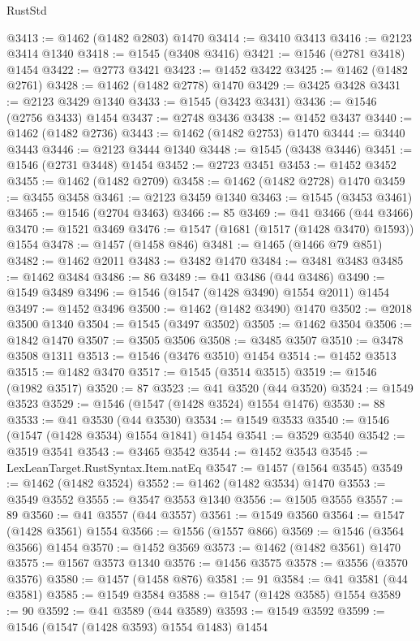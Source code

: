 \begin{lexlean}{RustStd}
\begin{coremodule}
@3413 := @1462 (@1482 @2803) @1470
@3414 := @3410 @3413
@3416 := @2123 @3414 @1340
@3418 := @1545 (@3408 @3416)
@3421 := @1546 (@2781 @3418) @1454
@3422 := @2773 @3421
@3423 := @1452 @3422
@3425 := @1462 (@1482 @2761)
@3428 := @1462 (@1482 @2778) @1470
@3429 := @3425 @3428
@3431 := @2123 @3429 @1340
@3433 := @1545 (@3423 @3431)
@3436 := @1546 (@2756 @3433) @1454
@3437 := @2748 @3436
@3438 := @1452 @3437
@3440 := @1462 (@1482 @2736)
@3443 := @1462 (@1482 @2753) @1470
@3444 := @3440 @3443
@3446 := @2123 @3444 @1340
@3448 := @1545 (@3438 @3446)
@3451 := @1546 (@2731 @3448) @1454
@3452 := @2723 @3451
@3453 := @1452 @3452
@3455 := @1462 (@1482 @2709)
@3458 := @1462 (@1482 @2728) @1470
@3459 := @3455 @3458
@3461 := @2123 @3459 @1340
@3463 := @1545 (@3453 @3461)
@3465 := @1546 (@2704 @3463)
@3466 := 85
@3469 := @41 @3466 (@44 @3466)
@3470 := @1521 @3469
@3476 := @1547 (@1681 (@1517 (@1428 @3470) @1593)) @1554
@3478 := @1457 (@1458 @846)
@3481 := @1465 (@1466 @79 @851)
@3482 := @1462 @2011
@3483 := @3482 @1470
@3484 := @3481 @3483
@3485 := @1462 @3484
@3486 := 86
@3489 := @41 @3486 (@44 @3486)
@3490 := @1549 @3489
@3496 := @1546 (@1547 (@1428 @3490) @1554 @2011) @1454
@3497 := @1452 @3496
@3500 := @1462 (@1482 @3490) @1470
@3502 := @2018 @3500 @1340
@3504 := @1545 (@3497 @3502)
@3505 := @1462 @3504
@3506 := @1842 @1470
@3507 := @3505 @3506
@3508 := @3485 @3507
@3510 := @3478 @3508 @1311
@3513 := @1546 (@3476 @3510) @1454
@3514 := @1452 @3513
@3515 := @1482 @3470
@3517 := @1545 (@3514 @3515)
@3519 := @1546 (@1982 @3517)
@3520 := 87
@3523 := @41 @3520 (@44 @3520)
@3524 := @1549 @3523
@3529 := @1546 (@1547 (@1428 @3524) @1554 @1476)
@3530 := 88
@3533 := @41 @3530 (@44 @3530)
@3534 := @1549 @3533
@3540 := @1546 (@1547 (@1428 @3534) @1554 @1841) @1454
@3541 := @3529 @3540
@3542 := @3519 @3541
@3543 := @3465 @3542
@3544 := @1452 @3543
@3545 := LexLeanTarget.RustSyntax.Item.natEq
@3547 := @1457 (@1564 @3545)
@3549 := @1462 (@1482 @3524)
@3552 := @1462 (@1482 @3534) @1470
@3553 := @3549 @3552
@3555 := @3547 @3553 @1340
@3556 := @1505 @3555
@3557 := 89
@3560 := @41 @3557 (@44 @3557)
@3561 := @1549 @3560
@3564 := @1547 (@1428 @3561) @1554
@3566 := @1556 (@1557 @866)
@3569 := @1546 (@3564 @3566) @1454
@3570 := @1452 @3569
@3573 := @1462 (@1482 @3561) @1470
@3575 := @1567 @3573 @1340
@3576 := @1456 @3575
@3578 := @3556 (@3570 @3576)
@3580 := @1457 (@1458 @876)
@3581 := 91
@3584 := @41 @3581 (@44 @3581)
@3585 := @1549 @3584
@3588 := @1547 (@1428 @3585) @1554
@3589 := 90
@3592 := @41 @3589 (@44 @3589)
@3593 := @1549 @3592
@3599 := @1546 (@1547 (@1428 @3593) @1554 @1483) @1454

\end{coremodule}
\end{lexlean}
